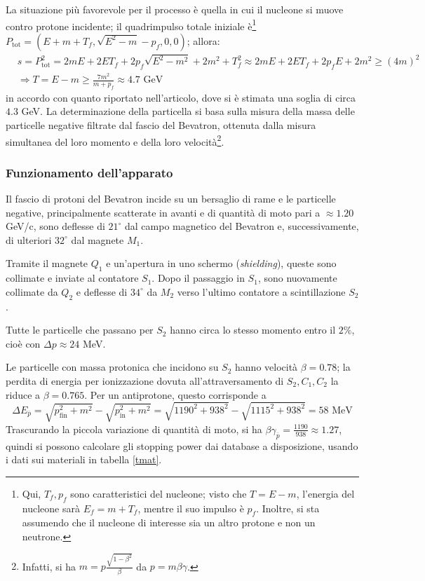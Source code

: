 \documentclass[10pt, a4paper]{scrartcl}
\numberwithin{equation}{subsection}
\theoremstyle{style1}
\begin{document}
La situazione pi\`u favorevole per il processo \`e quella in cui il nucleone si muove contro protone incidente; il quadrimpulso totale iniziale \`e\footnote{Qui, $T_f, p_f$ sono caratteristici del nucleone; visto che $T = E-m$, l'energia del nucleone sar\`a $E_f = m+T_f$, mentre il suo impulso \`e $p_f$. Inoltre, si sta assumendo che il nucleone di interesse sia un altro protone e non un neutrone.} $P_\text{tot} = (E+m +T_f,  \sqrt{E^2 - m} - p_f,0,0)$; allora:
\[
	\begin{split}
		&s = P_\text{tot}^2 = 2mE + 2ET_f + 2p_f \sqrt{E^2 - m^2 }  + 2m^2 + T_f^2 \approx 2mE + 2ET_f + 2p_f E+ 2m^2\ge (4m)^2\\
		&\Rightarrow T = E- m \ge \frac{7m^2}{m+ p_f}\approx 4.7 \text{ GeV}
	\end{split}
\] 
in accordo con quanto riportato nell'articolo, dove si \`e stimata una soglia di circa $4.3$ GeV. La determinazione della particella si basa sulla misura della massa delle particelle negative filtrate dal fascio del Bevatron, ottenuta dalla misura simultanea del loro momento e della loro velocit\`a\footnote{Infatti, si ha $m = p \frac{\sqrt{1 - \beta ^2} }{\beta }$ da $p = m \beta  \gamma$.}.

\subsubsection{Funzionamento dell'apparato}
Il fascio di protoni del Bevatron incide su un bersaglio di rame e le particelle negative, principalmente scatterate in avanti e di quantit\`a di moto pari a $\approx 1.20$ GeV/c, sono deflesse di $21^\circ$ dal campo magnetico del Bevatron e, successivamente, di ulteriori $32^\circ$ dal magnete $M_1$. 

Tramite il magnete $Q_1$ e un'apertura in uno schermo (\textit{shielding}), queste sono collimate e inviate al contatore $S_1$. Dopo il passaggio in $S_1$, sono nuovamente collimate da $Q_2$ e deflesse di $34^\circ$ da $M_2$ verso l'ultimo contatore a scintillazione $S_2$. 

Tutte le particelle che passano per $S_2$ hanno circa lo stesso momento entro il $2\%$, cio\`e con $\Delta p \approx 24$ MeV.

Le particelle con massa protonica che incidono su $S_2$ hanno velocit\`a $\beta  = 0.78$; la perdita di energia per ionizzazione dovuta all'attraversamento di $S_2, C_1 , C_{2}$ la riduce a $\beta  = 0.765$. Per un antiprotone, questo corrisponde a
\[
\Delta E_{\overline{p}}  = \sqrt{p_\text{fin}^2 +m^2} - \sqrt{p_\text{in}^2 + m^2} = \sqrt{1190^2 + 938^2} - \sqrt{1115^2 + 938^2} = 58 \text{ MeV}
\] 
Trascurando la piccola variazione di quantit\`a di moto, si ha $\beta \gamma_{\overline{p}} = \frac{1190}{938} \approx 1.27 $, quindi si possono calcolare gli stopping power dai database a disposizione, usando i dati sui materiali in tabella \ref{tmat}.
\end{document}
